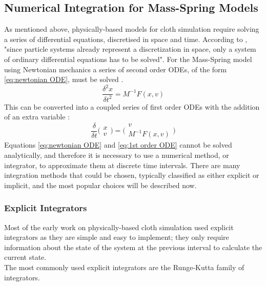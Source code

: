 \subsection{Numerical Integration for Mass-Spring Models}
As mentioned above, physically-based models for cloth simulation require solving a series of differential equations, discretised in space and time. According to \textcite[5]{Wacker2005a}, "since particle systems already represent a discretization in space, only a system of ordinary differential equations has to be solved". For the Mass-Spring model using Newtonian mechanics a series of second order ODEs, of the form \ref{eq:newtonian ODE}, must be solved \parencite[5]{Zink2007}.
\begin{equation}
\label{eq:newtonian ODE}
  \frac{\delta^{2}x}{\delta t^{2}} = M^{-1}F(x, v)
\end{equation}
This can be converted into a coupled series of first order ODEs with the addition of an extra variable \parencite[5]{Zink2007}:
\begin{equation}
\label{eq:1st order ODE}
  \frac{\delta}{\delta t} \bigg(\begin{array}{c}  x \\ v \end{array}\bigg) = \bigg(\begin{array}{c}  v \\ M^{-1}F(x, v) \end{array}\bigg)
\end{equation}
Equations \ref{eq:newtonian ODE} and \ref{eq:1st order ODE} cannot be solved analytically, and therefore it is necessary to use a numerical method, or integrator, to approximate them at discrete time intervals. There are many integration methods that could be chosen, typically classified as either explicit or implicit, and the most popular choices will be described now.

\subsubsection{Explicit Integrators}
Most of the early work on physically-based cloth simulation used explicit integrators as they are simple and easy to implement; they only require information about the state of the system at the previous interval to calculate the current state.
\\The most commonly used explicit integrators are the Runge-Kutta family of integrators.

